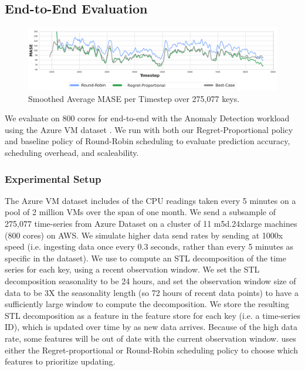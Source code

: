  

\subsection{End-to-End Evaluation}
\begin{figure}[t]
\begin{center}
\includegraphics[width=15cm]{ralf/figures/ralf_azure.pdf}
\centering
\end{center}
\caption{Smoothed Average MASE per Timestep over 275,077 keys.
}
\label{f:stl-time}
\end{figure}

We evaluate \system{} on 800 cores for end-to-end with the Anomaly Detection workload using the Azure VM dataset \cite{cortez2017resource}. We run \system{} with both our Regret-Proportional policy and baseline policy of Round-Robin scheduling to evaluate prediction accuracy, scheduling overhead, and scaleability.  

\subsubsection{Experimental Setup}
The Azure VM dataset includes of the CPU readings taken every 5 minutes on a pool of 2 million VMs over the span of one month. We send a subsample of 275,077 time-series from Azure Dataset on a cluster of 11 m5d.24xlarge machines (800 cores) on AWS. We simulate higher data send rates by sending at 1000x speed (i.e. ingesting data once every 0.3 seconds, rather than every 5 minutes as specific in the dataset). We use \system{} to compute an STL decomposition of the time series for each key, using a recent observation window. We set the STL decomposition seasonality to be 24 hours, and set the observation window size of data to be 3X the seasonality length (so 72 hours of recent data points) to have a sufficiently large window to compute the decomposition. We store the resulting STL decomposition as a feature in the feature store for each key (i.e. a time-series ID), which is updated over time by \system{} as new data arrives. Because of the high data rate, some features will be out of date with the current observation window. \system{} uses either the Regret-proportional or Round-Robin scheduling policy to choose which features to prioritize updating.

